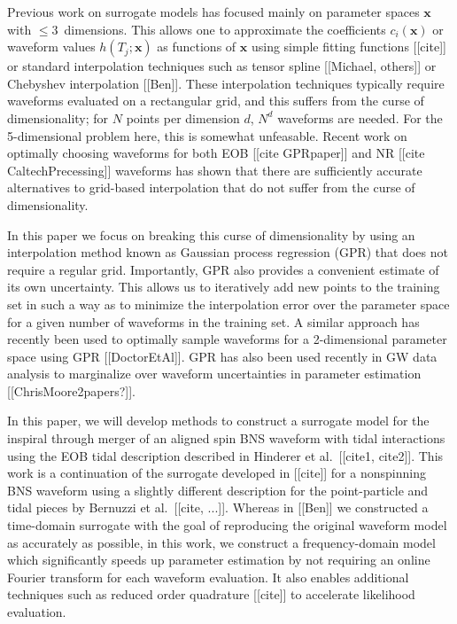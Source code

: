 \documentclass[prd,aps,letter,twocolumn,floatfix,notitlepage,nofootinbib]{revtex4-1}
\def\bx{\mathbf{x}}
\begin{document}
Previous work on surrogate models has focused mainly on parameter spaces $\bx$ with $\le 3$~dimensions. This allows one to approximate the coefficients $c_i(\bx)$ or waveform values $h(T_j; \bx)$ as functions of $\bx$ using simple fitting functions [[cite]] or standard interpolation techniques such as tensor spline [[Michael, others]] or Chebyshev interpolation [[Ben]]. These interpolation techniques typically require waveforms evaluated on a rectangular grid, and this suffers from the curse of dimensionality; for $N$ points per dimension $d$,  $N^d$ waveforms are needed. For the 5-dimensional problem here, this is somewhat unfeasable. Recent work on optimally choosing waveforms for both EOB [[cite GPRpaper]] and NR [[cite CaltechPrecessing]] waveforms has shown that there are sufficiently accurate alternatives to grid-based interpolation that do not suffer from the curse of dimensionality.

In this paper we focus on breaking this curse of dimensionality by using an interpolation method known as Gaussian process regression (GPR) that does not require a regular grid. Importantly, GPR also provides a convenient estimate of its own uncertainty. This allows us to iteratively add new points to the training set in such a way as to minimize the interpolation error over the parameter space for a given number of waveforms in the training set. A similar approach has recently been used to optimally sample waveforms for a 2-dimensional parameter space using GPR [[DoctorEtAl]]. GPR has also been used recently in GW data analysis to marginalize over waveform uncertainties in parameter estimation [[ChrisMoore2papers?]].

In this paper, we will develop methods to construct a surrogate model for the inspiral through merger of an aligned spin BNS waveform with tidal interactions using the EOB tidal description described in Hinderer et al.~[[cite1, cite2]]. This work is a continuation of the surrogate developed in [[cite]] for a nonspinning BNS waveform using a slightly different description for the point-particle and tidal pieces by Bernuzzi et al.~[[cite, ...]]. Whereas in [[Ben]] we constructed a time-domain surrogate with the goal of reproducing the original waveform model as accurately as possible, in this work, we construct a frequency-domain model which significantly speeds up parameter estimation by not requiring an online Fourier transform for each waveform evaluation. It also enables additional techniques such as reduced order quadrature [[cite]] to accelerate likelihood evaluation.
\end{document}
